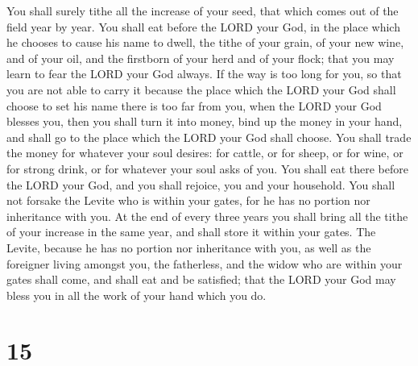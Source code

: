  You shall surely tithe all the increase of your seed,
that which comes out of the field year by year.  You
shall eat before the LORD your God, in the place which he chooses to
cause his name to dwell, the tithe of your grain, of your new wine, and
of your oil, and the firstborn of your herd and of your flock; that you
may learn to fear the LORD your God always.  If the way
is too long for you, so that you are not able to carry it because the
place which the LORD your God shall choose to set his name there is too
far from you, when the LORD your God blesses you,  then
you shall turn it into money, bind up the money in your hand, and shall
go to the place which the LORD your God shall choose. 
You shall trade the money for whatever your soul desires: for cattle, or
for sheep, or for wine, or for strong drink, or for whatever your soul
asks of you. You shall eat there before the LORD your God, and you shall
rejoice, you and your household.  You shall not forsake
the Levite who is within your gates, for he has no portion nor
inheritance with you.  At the end of every three years
you shall bring all the tithe of your increase in the same year, and
shall store it within your gates.  The Levite, because he
has no portion nor inheritance with you, as well as the foreigner living
amongst you, the fatherless, and the widow who are within your gates
shall come, and shall eat and be satisfied; that the LORD your God may
bless you in all the work of your hand which you do.

\hypertarget{section-14}{%
\section{15}\label{section-14}}

